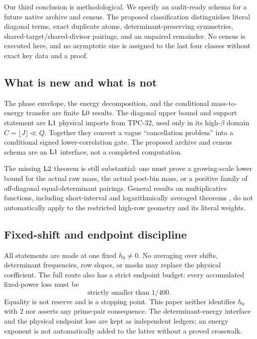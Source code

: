 Our third conclusion is methodological.  We specify an audit-ready
schema for a future native archive and census.  The proposed
classification distinguishes literal diagonal terms, exact duplicate
atoms, determinant-preserving symmetries, shared-target/shared-divisor
pairings, and an unpaired remainder.  No census is executed here, and
no asymptotic size is assigned to the last four classes without exact
key data and a proof.

\subsection{What is new and what is not}

The phase envelope, the energy decomposition, and the conditional
mass-to-energy transfer are finite \(\mathrm{L0}\) results.  The diagonal
upper bound and support statement are \(\mathrm{L1}\) physical imports from
TPC-32, used only in its high-\(\beta\) domain
\(C=\lfloor J\rfloor\ll Q\).  Together they convert a vague
``cancellation problem'' into a conditional signed lower-correlation
gate.  The proposed archive and census schema are an \(\mathrm{L1}\)
interface, not a completed computation.

The missing \(\mathrm{L2}\) theorem is still substantial: one must prove a
growing-scale lower bound for the actual raw mass, the actual
post-bin mass, or a positive family of off-diagonal equal-determinant
pairings.  General results on multiplicative functions, including
short-interval and logarithmically averaged theorems
\citep{MatomakiRadziwill2016,Tao2016}, do not automatically apply to
the restricted high-row geometry and its literal weights.

\subsection{Fixed-shift and endpoint discipline}

All statements are made at one fixed \(h_0\ne0\).  No averaging over
shifts, determinant frequencies, row slopes, or masks may replace the
physical coefficient.  The full route also has a strict endpoint
budget: every accumulated fixed-power loss must be
\[
 \boxed{\text{strictly smaller than }1/400.}
\]
Equality is not reserve and is a stopping point.  This paper neither
identifies \(h_0\) with \(2\) nor asserts any prime-pair consequence.
The determinant-energy interface and the physical endpoint loss are
kept as independent ledgers; an energy exponent is not automatically
added to the latter without a proved crosswalk.

